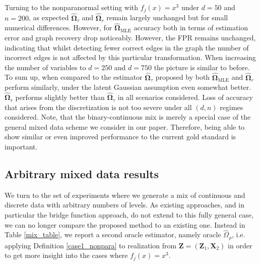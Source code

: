 Turning to the nonparanormal setting with $f_j(x) = x^3$ under $d = 50$ and $n=200$, as expected $\hat{\boldsymbol\Omega}_\tau$ and $\hat{\boldsymbol\Omega}_r$ remain largely unchanged but for small numerical differences. 
However, for $\hat{\boldsymbol\Omega}_{\text{MLE}}$ accuracy both in terms of estimation error and graph recovery drop noticeably. However, the FPR remains unchanged, indicating that whilst detecting fewer correct edges in the graph the number of incorrect edges is not affected by this particular transformation. When increasing the number of variables to $d=250$ and $d=750$ the picture is similar to before. To sum up, when compared to the estimator $\hat{\boldsymbol\Omega}_\tau$ proposed by \citet{Fan17} both $\hat{\boldsymbol\Omega}_{\text{MLE}}$ and $\hat{\boldsymbol\Omega}_r$ perform similarly, under the latent Gaussian assumption even somewhat better. $\hat{\boldsymbol\Omega}_r$ performs slightly better than $\hat{\boldsymbol\Omega}_\tau$ in all scenarios considered. Loss of accuracy that arises from the discretization is not too severe under all $(d,n)$ regimes considered. Note, that the binary-continuous mix is merely a special case of the general mixed data scheme we consider in our paper. Therefore, being able to show similar or even improved performance to the current gold standard is important.      

\subsection{Arbitrary mixed data results}

We turn to the set of experiments where we generate a mix of continuous and discrete data with arbitrary numbers of levels. As existing approaches, and in particular the bridge function approach, do not extend to this fully general case, we can no longer compare the proposed method to an existing one. Instead in Table \ref{mix_table}, we report a second oracle estimator, namely oracle $\hat{\Omega}_\rho$, i.e. applying Definition \ref{case1_nonpara} to realization from $\boldsymbol{Z} = (\boldsymbol{Z}_1, \boldsymbol{X}_2)$ in order to get more insight into the cases where $f_j(x) = x^3$.  


